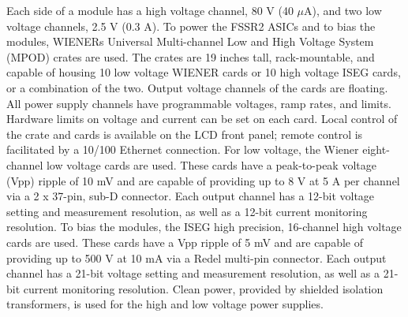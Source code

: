 Each side of a module has a high voltage channel, 80 V (40 $\mu$A), and two low voltage channels, 2.5 V (0.3 A). To power the FSSR2 ASICs and to bias the modules, WIENERs Universal Multi-channel Low and High Voltage System (MPOD) crates are used. The crates are 19 inches tall, rack-mountable, and capable of housing 10 low voltage WIENER cards or 10 high voltage ISEG cards, or a combination of the two. Output voltage channels of the cards are floating. All power supply channels have programmable voltages, ramp rates, and limits. Hardware limits on voltage and current can be set on each card. Local control of the crate and cards is available on the LCD front panel; remote control is facilitated by a 10/100 Ethernet connection. For low voltage, the Wiener eight-channel low voltage cards are used. These cards have a peak-to-peak voltage (Vpp) ripple of 10 mV and are capable of providing up to 8 V at 5 A per channel via a 2 x 37-pin, sub-D connector. Each output channel has a 12-bit voltage setting and measurement resolution, as well as a 12-bit current monitoring resolution. To bias the modules, the ISEG high precision, 16-channel high voltage cards are used. These cards have a Vpp ripple of 5 mV and are capable of providing up to 500 V at 10 mA via a Redel multi-pin connector. Each output channel has a 21-bit voltage setting and measurement resolution, as well as a 21-bit current monitoring resolution. Clean power, provided by shielded isolation transformers, is used for the high and low voltage power supplies.

